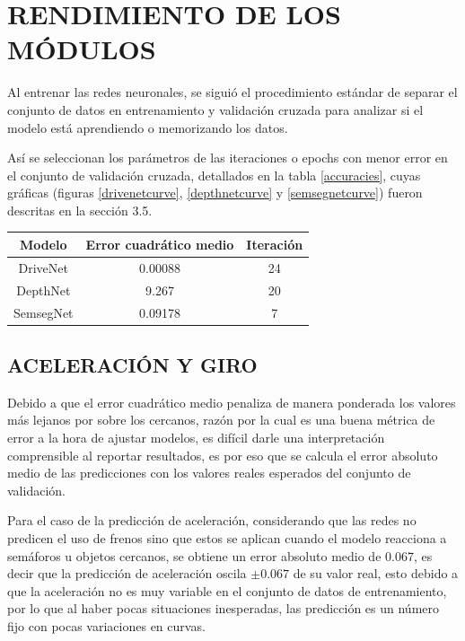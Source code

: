 \section{RENDIMIENTO DE LOS MÓDULOS} \label{metricas-error}
Al entrenar las redes neuronales, se siguió el procedimiento estándar de separar el conjunto de datos en entrenamiento y validación cruzada para analizar si el modelo está aprendiendo o memorizando los datos.

Así se seleccionan los parámetros de las iteraciones o epochs con menor error en el conjunto de validación cruzada, detallados en la tabla \ref{accuracies}, cuyas gráficas (figuras \ref{drivenetcurve}, \ref{depthnetcurve} y \ref{semsegnetcurve}) fueron descritas en la sección 3.5.

\begin{center}
	\footnotesize
	\begin{tabular}{|c|c|c|}
		\hline
		\textbf{Modelo} & \textbf{Error cuadrático medio} & \textbf{Iteración}\\
		\hline
		DriveNet & 0.00088 & 24\\
		\hline
		DepthNet & 9.267 & 20\\
		\hline
		SemsegNet & 0.09178 & 7\\
		\hline
	\end{tabular}
	\label{accuracies}
\end{center}

\subsection{ACELERACIÓN Y GIRO}
	Debido a que el error cuadrático medio penaliza de manera ponderada los valores más lejanos por sobre los cercanos, razón por la cual es una buena métrica de error a la hora de ajustar modelos, es difícil darle una interpretación comprensible al reportar resultados, es por eso que se calcula el error absoluto medio de las predicciones con los valores reales esperados del conjunto de validación.
	
	Para el caso de la predicción de aceleración, considerando que las redes no predicen el uso de frenos sino que estos se aplican cuando el modelo reacciona a semáforos u objetos cercanos, se obtiene un error absoluto medio de 0.067, es decir que la predicción de aceleración oscila $\pm 0.067$ de su valor real, esto debido a que la aceleración no es muy variable en el conjunto de datos de entrenamiento, por lo que al haber pocas situaciones inesperadas, las predicción es un número fijo con pocas variaciones en curvas.
	
